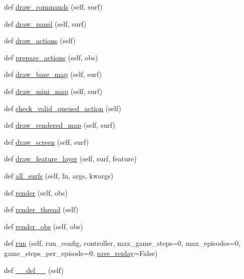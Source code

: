 \begin{DoxyCompactItemize}
def \mbox{\hyperlink{classpysc2_1_1lib_1_1renderer__human_1_1_renderer_human_a86f6a72aabfa9db703a7a046d85e4944}{draw\+\_\+commands}} (self, surf)
\item 
def \mbox{\hyperlink{classpysc2_1_1lib_1_1renderer__human_1_1_renderer_human_adf13e637859856e1bea579b7e864c6d1}{draw\+\_\+panel}} (self, surf)
\item 
def \mbox{\hyperlink{classpysc2_1_1lib_1_1renderer__human_1_1_renderer_human_a13c595cf6c121ca2277377b92374b379}{draw\+\_\+actions}} (self)
\item 
def \mbox{\hyperlink{classpysc2_1_1lib_1_1renderer__human_1_1_renderer_human_adebb204f609146564f48ab6848a24f32}{prepare\+\_\+actions}} (self, obs)
\item 
def \mbox{\hyperlink{classpysc2_1_1lib_1_1renderer__human_1_1_renderer_human_af63a5bda40912c1505a443ee497728d2}{draw\+\_\+base\+\_\+map}} (self, surf)
\item 
def \mbox{\hyperlink{classpysc2_1_1lib_1_1renderer__human_1_1_renderer_human_a4d4b724f888cdf61172d98c0275c4417}{draw\+\_\+mini\+\_\+map}} (self, surf)
\item 
def \mbox{\hyperlink{classpysc2_1_1lib_1_1renderer__human_1_1_renderer_human_a52e9b9f7a0bc37c672881dbe1f1e262f}{check\+\_\+valid\+\_\+queued\+\_\+action}} (self)
\item 
def \mbox{\hyperlink{classpysc2_1_1lib_1_1renderer__human_1_1_renderer_human_aa893875b298c12c987a6050c744323f3}{draw\+\_\+rendered\+\_\+map}} (self, surf)
\item 
def \mbox{\hyperlink{classpysc2_1_1lib_1_1renderer__human_1_1_renderer_human_a9f4b95d7b641f560d7c4c7151e445b95}{draw\+\_\+screen}} (self, surf)
\item 
def \mbox{\hyperlink{classpysc2_1_1lib_1_1renderer__human_1_1_renderer_human_a8fb3d6fe7070b1176eb54bf153586d8d}{draw\+\_\+feature\+\_\+layer}} (self, surf, feature)
\item 
def \mbox{\hyperlink{classpysc2_1_1lib_1_1renderer__human_1_1_renderer_human_a35641fd0489ce873dab71c737a54363d}{all\+\_\+surfs}} (self, fn, args, kwargs)
\item 
def \mbox{\hyperlink{classpysc2_1_1lib_1_1renderer__human_1_1_renderer_human_a53b0f200ed33a914ac4a4159ada4b520}{render}} (self, obs)
\item 
def \mbox{\hyperlink{classpysc2_1_1lib_1_1renderer__human_1_1_renderer_human_a1d0703f86bcb0ba30a30a6aa2b0bbd79}{render\+\_\+thread}} (self)
\item 
def \mbox{\hyperlink{classpysc2_1_1lib_1_1renderer__human_1_1_renderer_human_a90c82ff358c2166c432d2c1aa530021b}{render\+\_\+obs}} (self, obs)
\item 
def \mbox{\hyperlink{classpysc2_1_1lib_1_1renderer__human_1_1_renderer_human_ad30f49178466d7adc7a71ec31ffc61aa}{run}} (self, run\+\_\+config, controller, max\+\_\+game\+\_\+steps=0, max\+\_\+episodes=0, game\+\_\+steps\+\_\+per\+\_\+episode=0, \mbox{\hyperlink{classpysc2_1_1lib_1_1renderer__human_1_1_renderer_human_af7ca690aa563114ab576736a8d04b83a}{save\+\_\+replay}}=False)
\item 
def \mbox{\hyperlink{classpysc2_1_1lib_1_1renderer__human_1_1_renderer_human_a74cbc7712f1c882681908b038fd2329e}{\+\_\+\+\_\+del\+\_\+\+\_\+}} (self)
\end{DoxyCompactItemize}
